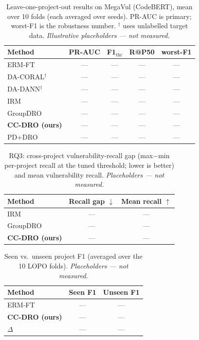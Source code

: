 \documentclass[conference]{IEEEtran}
\begin{document}
\begin{table}[t]
\centering
\caption{Leave-one-project-out results on MegaVul (CodeBERT),
mean over 10 folds (each averaged over seeds). PR-AUC is primary;
worst-F1 is the robustness number. $^\dagger$ uses unlabelled
target data. \emph{Illustrative placeholders --- not measured.}}
\label{tab:main}
\begin{tabular}{lcccc}
\toprule
Method & PR-AUC & F1$_{\text{thr}}$ & R@P50 & worst-F1 \\
\midrule
ERM-FT             & --- & --- & --- & --- \\
DA-CORAL$^\dagger$ & --- & --- & --- & --- \\
DA-DANN$^\dagger$  & --- & --- & --- & --- \\
IRM                & --- & --- & --- & --- \\
GroupDRO           & --- & --- & --- & --- \\
\textbf{CC-DRO (ours)} & --- & --- & --- & --- \\
PD+DRO             & --- & --- & --- & --- \\
\bottomrule
\end{tabular}
\end{table}

\begin{table}[t]
\centering
\caption{RQ3: cross-project vulnerability-recall gap (max$-$min
per-project recall at the tuned threshold; lower is better) and
mean vulnerability recall. \emph{Placeholders --- not measured.}}
\label{tab:gap}
\begin{tabular}{lcc}
\toprule
Method & Recall gap $\downarrow$ & Mean recall $\uparrow$ \\
\midrule
IRM      & --- & --- \\
GroupDRO & --- & --- \\
\textbf{CC-DRO (ours)} & --- & --- \\
\bottomrule
\end{tabular}
\end{table}

\begin{table}[t]
\centering
\caption{Seen vs.\ unseen project F1 (averaged over the 10 LOPO
folds). \emph{Placeholders --- not measured.}}
\label{tab:seen}
\begin{tabular}{lcc}
\toprule
Method & Seen F1 & Unseen F1 \\
\midrule
ERM-FT & --- & --- \\
\textbf{CC-DRO (ours)} & --- & --- \\
$\Delta$ & --- & --- \\
\bottomrule
\end{tabular}
\end{table}
\end{document}
